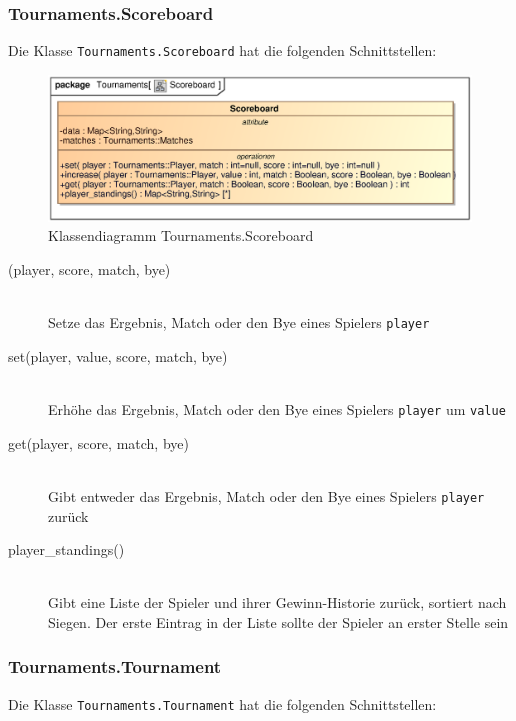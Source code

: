 \subsubsection{Tournaments.Scoreboard}
Die Klasse \verb|Tournaments.Scoreboard| hat die folgenden Schnittstellen:

\begin{figure}[H]
    \myfloatalign
    \includegraphics[width=\textwidth]{gfx/MtGDeepAnalysis/Scoreboard.eps}
    \caption{Klassendiagramm Tournaments.Scoreboard}
    \label{fig:class:Tournaments.Scoreboard}
\end{figure}

\begin{description}
    \item[(player, score, match, bye)] \hfill \\
    Setze das Ergebnis, Match oder den Bye eines Spielers \verb|player|
     
    \item[set(player, value, score, match, bye)] \hfill \\
    Erhöhe das Ergebnis, Match oder den Bye eines Spielers \verb|player| um \verb|value|
    
    \item[get(player, score, match, bye)] \hfill \\
    Gibt entweder das Ergebnis, Match oder den Bye eines Spielers \verb|player| zurück
    
    \item[player\_standings()] \hfill \\
    Gibt eine Liste der Spieler und ihrer Gewinn-Historie zurück, sortiert nach Siegen. Der erste Eintrag in der Liste sollte der Spieler an erster Stelle sein
\end{description}

\subsubsection{Tournaments.Tournament}
Die Klasse \verb|Tournaments.Tournament| hat die folgenden Schnittstellen:

